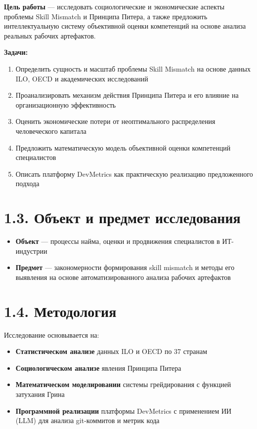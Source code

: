 \documentclass[
  russian,
]{report}
\providecommand{\tightlist}{%
  \setlength{\itemsep}{0pt}\setlength{\parskip}{0pt}}
\begin{document}
\textbf{Цель работы} --- исследовать социологические и экономические
аспекты проблемы Skill Mismatch и Принципа Питера, а также предложить
интеллектуальную систему объективной оценки компетенций на основе
анализа реальных рабочих артефактов.

\textbf{Задачи:}

\begin{enumerate}
\def\labelenumi{\arabic{enumi}.}
\tightlist
\item
  Определить сущность и масштаб проблемы Skill Mismatch на основе данных
  ILO, OECD и академических исследований
\item
  Проанализировать механизм действия Принципа Питера и его влияние на
  организационную эффективность
\item
  Оценить экономические потери от неоптимального распределения
  человеческого капитала
\item
  Предложить математическую модель объективной оценки компетенций
  специалистов
\item
  Описать платформу DevMetrics как практическую реализацию предложенного
  подхода
\end{enumerate}

\section{1.3. Объект и предмет
исследования}\label{ux43eux431ux44aux435ux43aux442-ux438-ux43fux440ux435ux434ux43cux435ux442-ux438ux441ux441ux43bux435ux434ux43eux432ux430ux43dux438ux44f}

\begin{itemize}
\tightlist
\item
  \textbf{Объект} --- процессы найма, оценки и продвижения специалистов
  в ИТ-индустрии
\item
  \textbf{Предмет} --- закономерности формирования skill mismatch и
  методы его выявления на основе автоматизированного анализа рабочих
  артефактов
\end{itemize}

\section{1.4.
Методология}\label{ux43cux435ux442ux43eux434ux43eux43bux43eux433ux438ux44f}

Исследование основывается на:

\begin{itemize}
\tightlist
\item
  \textbf{Статистическом анализе} данных ILO и OECD по 37 странам
\item
  \textbf{Социологическом анализе} явления Принципа Питера
\item
  \textbf{Математическом моделировании} системы грейдирования с функцией
  затухания Грина
\item
  \textbf{Программной реализации} платформы DevMetrics с применением ИИ
  (LLM) для анализа git-коммитов и метрик кода
\end{itemize}

\newpage
\end{document}
